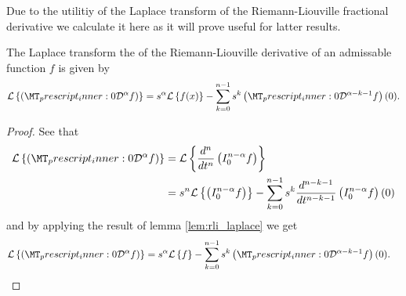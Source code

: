 Due to the utilitiy of the Laplace transform of the Riemann-Liouville fractional derivative we calculate it here as it will prove useful for latter results.
\begin{mdframed}[innertopmargin=10pt]
\begin{lemma}
\label{lem:lap_rld}
	The Laplace transform the of the Riemann-Liouville derivative of an admissable function $ f $ is given by
	\begin{align*}
		\mathcal{L} \left\{ \rld{0}{}{\alpha}{f} \right\} = s^\alpha \mathcal{L} \left\{ f(x) \right\} - \sum_{k=0}^{n-1} s^{k} \rld{0}{}{\alpha-k-1}{f}(0).
	\end{align*}
\end{lemma}
\end{mdframed}
\begin{proof}
	See that
	\begin{align*}
		\laplace{ \rld{0}{}{\alpha}{f} } &= \laplace{ \der{}{t}{n} \rli{0}{n-\alpha}{f} } \\
		&= s^n\laplace{\rli{0}{n-\alpha}{f}} - \sum_{k=0}^{n-1} s^k \der{}{t}{n-k-1} \rli{0}{n-\alpha}{f}(0)
	\end{align*}
	and by applying the result of lemma \ref{lem:rli_laplace} we get
	\begin{align*}
			\mathcal{L} \left\{\rld{0}{}{\alpha}{f} \right\} &= s^\alpha \laplace{f} - \sum_{k=0}^{n-1} s^{k} \rld{0}{}{\alpha - k - 1}{f}(0). 
	\end{align*} 
\end{proof}

